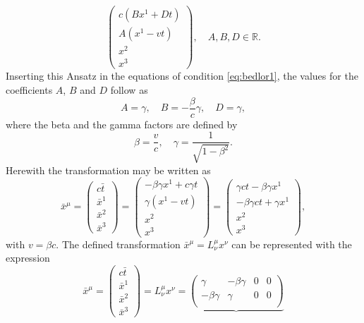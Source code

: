 \documentclass[a4paper,11pt]{article}
\numberwithin{equation}{section}
\begin{document}
{\begin{equation}
\begin{pmatrix}
c (Bx^1 +  Dt) \\ A(x^1-vt) \\ x^2 \\ x^3
\end{pmatrix}, \quad A,B,D \in \mathbb{R}.
\end{equation} Inserting this Ansatz in the equations of condition \eqref{eq:bedlor1}, the values for the coefficients $A$, $B$ and $D$ follow as \begin{equation}
A = \gamma, \quad B = -\frac{\beta}{c}\gamma, \quad D = \gamma,\end{equation} where the beta and the gamma factors are defined by \begin{equation} \beta = \frac{v}{c}, \quad \gamma = \frac{1}{\sqrt{1-\beta^2}}.
\end{equation} Herewith the transformation may be written as \begin{equation}
\bar{x}^\mu = \begin{pmatrix}
c \bar{t}\, \\ \bar{x}^1 \\ \bar{x}^2 \\ \bar{x}^3
\end{pmatrix} = \begin{pmatrix}
-\beta \gamma x^1 + c \gamma t \\ \gamma (x^1-vt) \\ x^2 \\ x^3
\end{pmatrix} = \begin{pmatrix}
\gamma c t - \beta \gamma x^1 \\ -\beta \gamma c t + \gamma x^1 \\ x^2 \\ x^3
\end{pmatrix},
\end{equation} with $v = \beta c $. The defined transformation $\bar{x}^\mu = L^\mu_{\nu} x^\nu$ can be represented with the expression \begin{equation}
\bar{x}^\mu = \begin{pmatrix}
c\bar{t} \\ \bar{x}^1 \\ \bar{x}^2 \\ \bar{x}^3
\end{pmatrix} = L^\mu_{\nu} x^\nu = \underbrace{\begin{pmatrix}
\gamma & -\beta\gamma & 0 & 0 \\
-\beta\gamma & \gamma & 0 & 0 \\

\end{pmatrix}}
\end{equation}}
\end{document}
